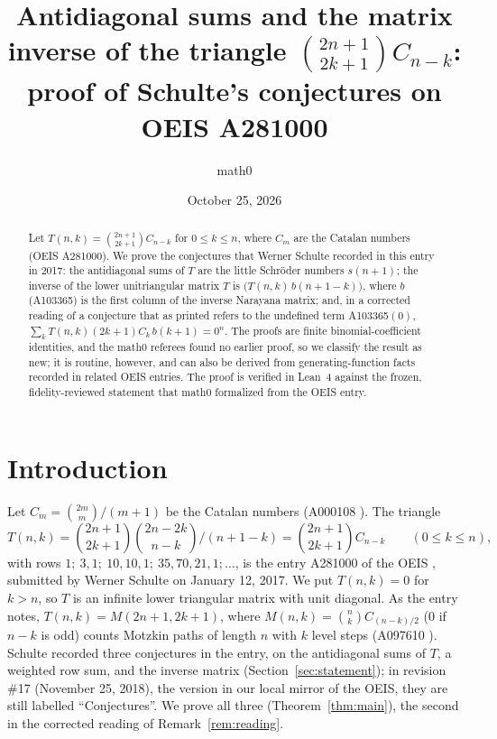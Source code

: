 \documentclass[11pt]{amsart}
\title[Schulte's conjectures on OEIS A281000]{Antidiagonal sums and the matrix inverse of the triangle $\binom{2n+1}{2k+1}C_{n-k}$: proof of Schulte's conjectures on OEIS A281000}
\author{math0}
\date{October 25, 2026}
\theoremstyle{plain}
\theoremstyle{definition}
\begin{document}
\begin{abstract}
Let $T(n,k)=\binom{2n+1}{2k+1}C_{n-k}$ for $0\le k\le n$, where $C_m$ are the Catalan numbers (OEIS A281000).
We prove the conjectures that Werner Schulte recorded in this entry in 2017: the antidiagonal sums of $T$ are the little Schr\"oder numbers $s(n+1)$; the inverse of the lower unitriangular matrix $T$ is $\bigl(T(n,k)\,b(n+1-k)\bigr)$, where $b$ (A103365) is the first column of the inverse Narayana matrix; and, in a corrected reading of a conjecture that as printed refers to the undefined term A103365$(0)$, $\sum_kT(n,k)(2k+1)C_k\,b(k+1)=0^n$.
The proofs are finite binomial-coefficient identities, and the math0 referees found no earlier proof, so we classify the result as new; it is routine, however, and can also be derived from generating-function facts recorded in related OEIS entries.
The proof is verified in Lean~4 against the frozen, fidelity-reviewed statement that math0 formalized from the OEIS entry.
\end{abstract}
\maketitle

\section{Introduction}

Let $C_m=\binom{2m}{m}/(m+1)$ be the Catalan numbers (A000108 \cite{A000108}). The triangle
\[
  T(n,k)=\binom{2n+1}{2k+1}\binom{2n-2k}{n-k}\Big/(n+1-k)=\binom{2n+1}{2k+1}C_{n-k}\qquad(0\le k\le n),
\]
with rows $1;\ 3,1;\ 10,10,1;\ 35,70,21,1;\dots$, is the entry A281000 of the OEIS \cite{A281000}, submitted by Werner Schulte on January 12, 2017. We put $T(n,k)=0$ for $k>n$, so $T$ is an infinite lower triangular matrix with unit diagonal. As the entry notes, $T(n,k)=M(2n+1,2k+1)$, where $M(n,k)=\binom nk C_{(n-k)/2}$ ($0$ if $n-k$ is odd) counts Motzkin paths of length $n$ with $k$ level steps (A097610 \cite{A097610}). Schulte recorded three conjectures in the entry, on the antidiagonal sums of $T$, a weighted row sum, and the inverse matrix (Section~\ref{sec:statement}); in revision \#17 (November 25, 2018), the version in our local mirror of the OEIS, they are still labelled ``Conjectures''. We prove all three (Theorem~\ref{thm:main}), the second in the corrected reading of Remark~\ref{rem:reading}.
\end{document}
